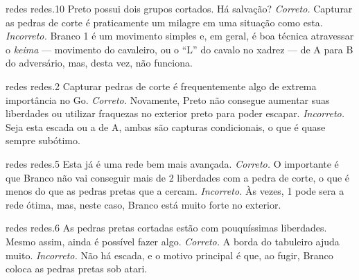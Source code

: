 \problemAnswerDiagram
  {redes}
  {redes.10}
  {Preto possui dois grupos cortados. Há salvação?}
  {\emph{Correto.} Capturar as pedras de corte é praticamente um milagre em uma situação como esta.}
  {\emph{Incorreto.} Branco 1 é um movimento simples e, em geral, é boa técnica atravessar o \emph{keima} --- movimento do cavaleiro, ou o ``L'' do cavalo no xadrez --- de A para B do adversário, mas, desta vez, não funciona.}

\problemAnswerDiagram
  {redes}
  {redes.2}
  {Capturar pedras de corte é frequentemente algo de extrema importância no Go.}
  {\emph{Correto.} Novamente, Preto não consegue aumentar suas liberdades ou utilizar fraquezas no exterior preto para poder escapar.}
  {\emph{Incorreto.} Seja esta escada ou a de A, ambas são capturas condicionais, o que é quase sempre subótimo.}

\problemAnswerDiagram
  {redes}
  {redes.5}
  {Esta já é uma rede bem mais avançada.}
  {\emph{Correto.} O importante é que Branco não vai conseguir mais de 2 liberdades com a pedra de corte, o que é menos do que as pedras pretas que a cercam.}
  {\emph{Incorreto.} Às vezes, 1 pode sera a rede ótima, mas, neste caso, Branco está muito forte no exterior.}

\problemAnswerDiagram
  {redes}
  {redes.6}
  {As pedras pretas cortadas estão com pouquíssimas liberdades. Mesmo assim, ainda é possível fazer algo.}
  {\emph{Correto.} A borda do tabuleiro ajuda muito.}
  {\emph{Incorreto.} Não há escada, e o motivo principal é que, ao fugir, Branco coloca as pedras pretas sob atari.}
